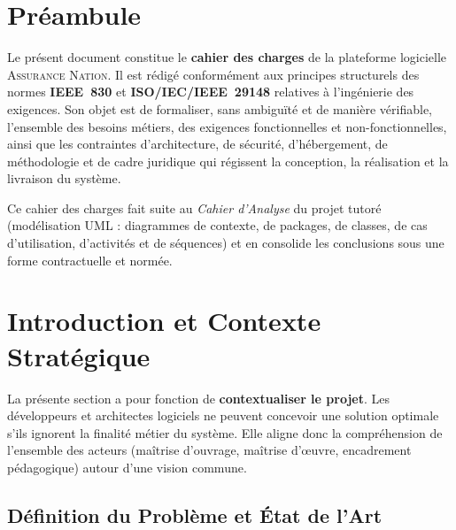 \documentclass[11pt,a4paper]{article}
\begin{document}
\tableofcontents
\thispagestyle{empty}
\clearpage

\section*{Préambule}

Le présent document constitue le \textbf{cahier des charges} de la plateforme
logicielle \textsc{Assurance Nation}. Il est rédigé conformément aux principes
structurels des normes \textbf{IEEE~830} et \textbf{ISO/IEC/IEEE~29148} relatives
à l'ingénierie des exigences. Son objet est de formaliser, sans ambiguïté et de
manière vérifiable, l'ensemble des besoins métiers, des exigences fonctionnelles
et non-fonctionnelles, ainsi que les contraintes d'architecture, de sécurité,
d'hébergement, de méthodologie et de cadre juridique qui régissent la conception,
la réalisation et la livraison du système.

Ce cahier des charges fait suite au \emph{Cahier d'Analyse} du projet tutoré
(modélisation UML : diagrammes de contexte, de packages, de classes, de cas
d'utilisation, d'activités et de séquences) et en consolide les conclusions sous
une forme contractuelle et normée.

\setcounter{section}{0}
\section{Introduction et Contexte Stratégique}

La présente section a pour fonction de \textbf{contextualiser le projet}. Les
développeurs et architectes logiciels ne peuvent concevoir une solution optimale
s'ils ignorent la finalité métier du système. Elle aligne donc la compréhension de
l'ensemble des acteurs (maîtrise d'ouvrage, maîtrise d'œuvre, encadrement
pédagogique) autour d'une vision commune.

\subsection{Définition du Problème et État de l'Art}
\end{document}
